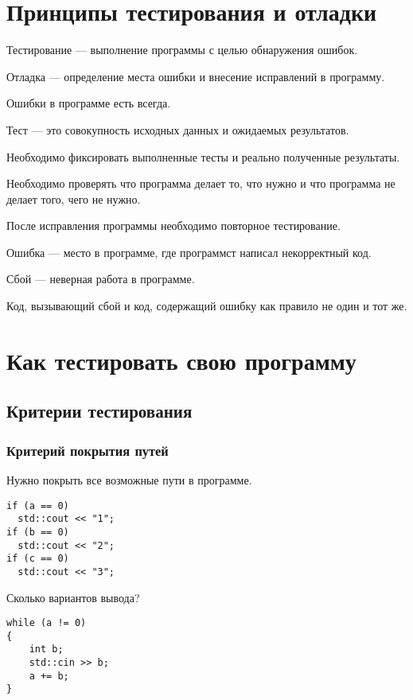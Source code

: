 \documentclass[14pt,openany]{book}
\begin{document}
\begingroup
\hypersetup{linkcolor=black}
\tableofcontents
\endgroup

\clearpage

\chapter{Принципы тестирования и отладки}

Тестирование --- выполнение программы с целью обнаружения ошибок.

Отладка --- определение места ошибки и внесение исправлений в программу.

Ошибки в программе есть всегда.

Тест --- это совокупность исходных данных и ожидаемых результатов.

Необходимо фиксировать выполненные тесты и реально полученные результаты.

Необходимо проверять что программа делает то, что нужно и что программа
не делает того, чего не нужно.

После исправления программы необходимо повторное тестирование.

Ошибка --- место в программе, где программст написал некорректный код.

Сбой --- неверная работа в программе.

Код, вызывающий сбой и код, содержащий ошибку как правило не один и тот же.

\chapter{Как тестировать свою программу}

\section{Критерии тестирования}

\subsection{Критерий покрытия путей}

Нужно покрыть все возможные пути в программе. 

\begin{lstlisting}
if (a == 0)
  std::cout << "1";
if (b == 0)
  std::cout << "2";
if (c == 0)
  std::cout << "3";
\end{lstlisting}

Сколько вариантов вывода?

\begin{lstlisting}
while (a != 0)
{
    int b;
    std::cin >> b;
    a += b;
}
\end{lstlisting}
\end{document}
